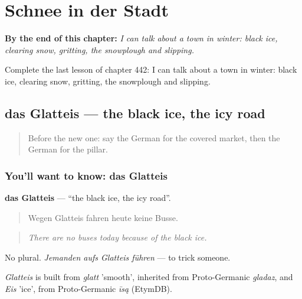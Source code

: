 
\chapter{Schnee in der Stadt}
\label{ch:ge-schnee-in-der-stadt}

\begin{chapteropening}
\textbf{By the end of this chapter:} \emph{I can talk about a town in winter: black ice, clearing snow, gritting, the snowplough and slipping.}

Complete the last lesson of chapter 442: I can talk about a town in winter: black ice, clearing snow, gritting, the snowplough and slipping.
\end{chapteropening}

\section[das Glatteis]{das Glatteis — the black ice, the icy road}

\label{lesson:GE-C442-glatteis}



\begin{quote}
Before the new one: say the German for the covered market, then the German for the pillar.
\end{quote}

\subsection*{You'll want to know: das Glatteis}
\textbf{das Glatteis} — \textquotedblleft{}the black ice, the icy road\textquotedblright{}.

\begin{quote}
Wegen Glatteis fahren heute keine Busse.
\end{quote}

\begin{quote}
\emph{There are no buses today because of the black ice.}
\end{quote}

No plural. \emph{Jemanden aufs Glatteis führen} — to trick someone.

\begin{cousinweb}
\emph{Glatteis} is built from \emph{glatt} 'smooth', inherited from Proto-Germanic \emph{gladaz}, and \emph{Eis} 'ice', from Proto-Germanic \emph{īsą} (EtymDB).
\end{cousinweb}

